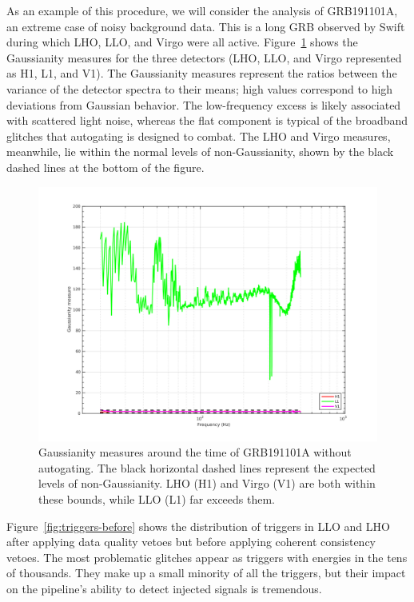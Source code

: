 As an example of this procedure, we will consider the analysis of GRB191101A, an extreme case of noisy background data.
This is a long GRB observed by Swift during which LHO, LLO, and Virgo were all active.
Figure~\ref{fig:gauss-before} shows the Gaussianity measures for the three detectors (LHO, LLO, and Virgo represented as H1, L1, and V1).
The Gaussianity measures represent the ratios between the variance of the detector spectra to their means; high values correspond to high deviations from Gaussian behavior.
The low-frequency excess is likely associated with scattered light noise, whereas the flat component is typical of the broadband glitches that autogating is designed to combat.
The LHO and Virgo measures, meanwhile, lie within the normal levels of non-Gaussianity, shown by the black dashed lines at the bottom of the figure.

\begin{figure}[htb]
	\includegraphics[trim={2cm 1.2cm 2cm 1.5cm}, clip, width=\textwidth]{figures/grb/gauss-before.png}
	\caption[Gaussianity measures around the time of GRB191101A without autogating.]
	{Gaussianity measures around the time of GRB191101A without autogating. The black horizontal dashed lines represent the expected levels of non-Gaussianity. LHO (H1) and Virgo (V1) are both within these bounds, while LLO (L1) far exceeds them.}
	\label{fig:gauss-before}
\end{figure}

Figure~\ref{fig:triggers-before} shows the distribution of triggers in LLO and LHO after applying data quality vetoes but before applying coherent consistency vetoes.
The most problematic glitches appear as triggers with energies in the tens of thousands.
They make up a small minority of all the triggers, but their impact on the pipeline's ability to detect injected signals is tremendous.

